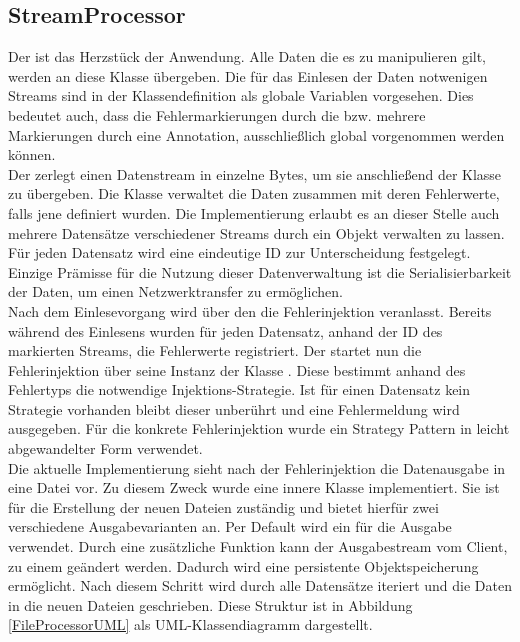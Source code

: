 \subsection{StreamProcessor}

Der  ist das Herzst\"uck der Anwendung. Alle Daten die es zu manipulieren gilt, werden an diese Klasse übergeben. Die für das Einlesen der Daten notwenigen Streams sind in der Klassendefinition als globale Variablen vorgesehen. Dies bedeutet auch, dass die Fehlermarkierungen durch die  bzw. mehrere Markierungen durch eine  Annotation, ausschlie\ss lich global vorgenommen werden können.\\ 
Der  zerlegt einen Datenstream in einzelne Bytes, um sie anschlie\ss end der Klasse  zu übergeben. Die Klasse  verwaltet die Daten zusammen mit deren Fehlerwerte, falls jene definiert wurden. Die Implementierung erlaubt es an dieser Stelle auch mehrere Datens\"atze verschiedener Streams durch ein  Objekt verwalten zu lassen. Für jeden Datensatz wird eine eindeutige ID zur Unterscheidung festgelegt. Einzige Prämisse für die Nutzung dieser Datenverwaltung ist die Serialisierbarkeit der Daten, um einen Netzwerktransfer zu erm\"oglichen.\\
Nach dem Einlesevorgang wird über den  die Fehlerinjektion veranlasst. Bereits während des Einlesens wurden für jeden Datensatz, anhand der ID des markierten Streams, die Fehlerwerte registriert. Der startet nun die Fehlerinjektion über seine Instanz der Klasse . Diese bestimmt anhand des Fehlertyps die notwendige Injektions-Strategie. Ist für einen Datensatz kein Strategie vorhanden bleibt dieser unberührt und eine Fehlermeldung wird ausgegeben. Für die konkrete Fehlerinjektion wurde ein Strategy Pattern in leicht abgewandelter Form verwendet. \\
Die aktuelle Implementierung sieht nach der Fehlerinjektion die Datenausgabe in eine Datei vor. Zu diesem Zweck wurde eine innere Klasse  implementiert. Sie ist f\"ur die Erstellung der neuen Dateien zust\"andig und bietet hierfür zwei verschiedene Ausgabevarianten an. Per Default wird ein  für die Ausgabe verwendet. Durch eine zusätzliche Funktion kann der Ausgabestream vom Client, zu einem  geändert werden. Dadurch wird eine persistente Objektspeicherung ermöglicht. Nach diesem Schritt wird durch alle Datens\"atze iteriert und die Daten in die neuen Dateien geschrieben. Diese Struktur ist in Abbildung \ref{FileProcessorUML} als UML-Klassendiagramm dargestellt.

